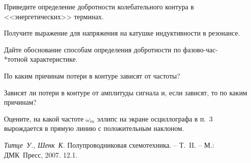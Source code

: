 \begin{lab:questions}

    \item   Приведите определение добротности колебательного контура в <<энергетических>> терминах.

    \item  Получите выражение для напряжения на катушке индуктивности  в резонансе.

    \item Дайте обоснование способам определения добротности по фазово-час-\\*тотной характеристике.

    \item По каким причинам потери в контуре зависят от частоты?

    \item * Зависят ли потери в контуре от амплитуды сигнала и, если зависят, то по каким причинам?

    \item * Оцените, на какой частоте $\omega_m$ эллипс на экране осциллографа в п.~3 вырождается в прямую линию с положительным наклоном.
\end{lab:questions}

\begin{lab:literature}
    \item \emph{Титце~У., Шенк~К.} Полупроводниковая схемотехника.  – Т.~II. – М.: ДМК~Пресс, 2007. 12.1.
\end{lab:literature}
